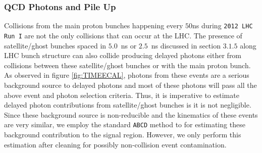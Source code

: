 \subsubsection{QCD Photons and Pile Up}
Collisions from the main proton bunches happening every $50$ns during \texttt{2012 LHC Run I} are not the only collisions that can occur at the LHC. The presence of  satellite/ghost bunches spaced in $5.0$~ns or $2.5$~ns discussed in section $3.1.5$ along LHC bunch structure can also collide producing delayed photons either from collisions between these satellite/ghost bunches or with the main proton bunch.
As observed in figure \ref{fig:TIMEECAL}, photons from these events are a serious background source to delayed photons and most of these photons will pass all the above event and photon selection criteria. Thus, it is imperative to 
estimate delayed photon contributions from satellite/ghost bunches is it is not negligible. Since these background source is non-reducible and the kinematics of these events are very similar, we employ the standard \texttt{ABCD} method to for estimating these background contribution to the signal region. However, we only perform this estimation after cleaning for possibly non-collision event contamination.



